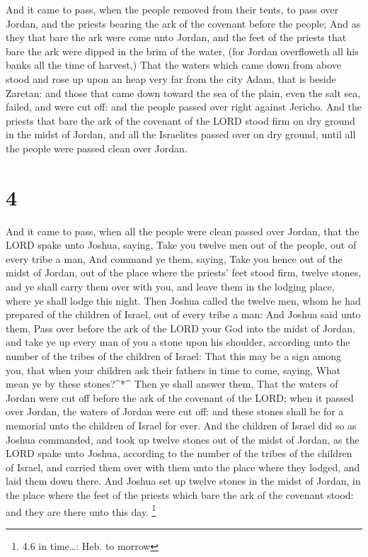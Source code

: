  And it came to pass, when the people removed from their
tents, to pass over Jordan, and the priests bearing the ark of the
covenant before the people;  And as they that bare the ark
were come unto Jordan, and the feet of the priests that bare the ark
were dipped in the brim of the water, (for Jordan overfloweth all his
banks all the time of harvest,)  That the waters which came
down from above stood and rose up upon an heap very far from the city
Adam, that is beside Zaretan: and those that came down toward the sea of
the plain, even the salt sea, failed, and were cut off: and the people
passed over right against Jericho.  And the priests that
bare the ark of the covenant of the LORD stood firm on dry ground in the
midst of Jordan, and all the Israelites passed over on dry ground, until
all the people were passed clean over Jordan.

\hypertarget{section-3}{%
\section{4}\label{section-3}}

 And it came to pass, when all the people were clean passed
over Jordan, that the LORD spake unto Joshua, saying,  Take
you twelve men out of the people, out of every tribe a man, 
And command ye them, saying, Take you hence out of the midst of Jordan,
out of the place where the priests' feet stood firm, twelve stones, and
ye shall carry them over with you, and leave them in the lodging place,
where ye shall lodge this night.  Then Joshua called the
twelve men, whom he had prepared of the children of Israel, out of every
tribe a man:  And Joshua said unto them, Pass over before
the ark of the LORD your God into the midst of Jordan, and take ye up
every man of you a stone upon his shoulder, according unto the number of
the tribes of the children of Israel:  That this may be a
sign among you, that when your children ask their fathers in time to
come, saying, What mean ye by these stones?\^{}*\^{}  Then
ye shall answer them, That the waters of Jordan were cut off before the
ark of the covenant of the LORD; when it passed over Jordan, the waters
of Jordan were cut off: and these stones shall be for a memorial unto
the children of Israel for ever.  And the children of Israel
did so as Joshua commanded, and took up twelve stones out of the midst
of Jordan, as the LORD spake unto Joshua, according to the number of the
tribes of the children of Israel, and carried them over with them unto
the place where they lodged, and laid them down there.  And
Joshua set up twelve stones in the midst of Jordan, in the place where
the feet of the priests which bare the ark of the covenant stood: and
they are there unto this day. \footnote{4.6 in time\ldots: Heb. to
  morrow}

